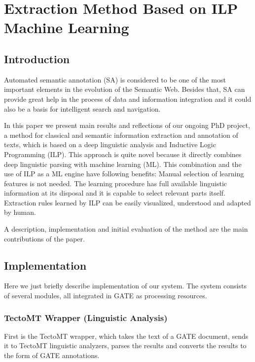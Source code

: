 \chapter{Extraction Method Based on ILP Machine Learning}


\section{Introduction}
Automated semantic annotation (SA) is considered to be one of the most important elements in the evolution of the Semantic Web. Besides that, SA can provide great help in the process of data and information integration and it could also be a basis for intelligent search and navigation.

In this paper we present main results and reflections of our ongoing PhD project, a method for classical and semantic information extraction and annotation of texts, which is based on a deep linguistic analysis and Inductive Logic Programming (ILP). This approach is quite novel because it directly combines deep linguistic parsing with machine learning (ML). This combination and the use of ILP as a ML engine have following benefits: Manual selection of learning features is not needed. 
The learning procedure has full available linguistic information at its disposal and it is capable to select relevant parts itself. Extraction rules learned by ILP can be easily visualized, understood and adapted by human.

A description, implementation and initial evaluation of the method are the main contributions of the paper.









\section{Implementation}
Here we just briefly describe implementation of our system. The system consists of several modules, all integrated in GATE as processing resources.

\subsection{TectoMT Wrapper (Linguistic Analysis)}
First is the TectoMT wrapper, which takes the text of a GATE document, sends it to TectoMT linguistic analyzers, parses the results and converts the results to the form of GATE annotations.

